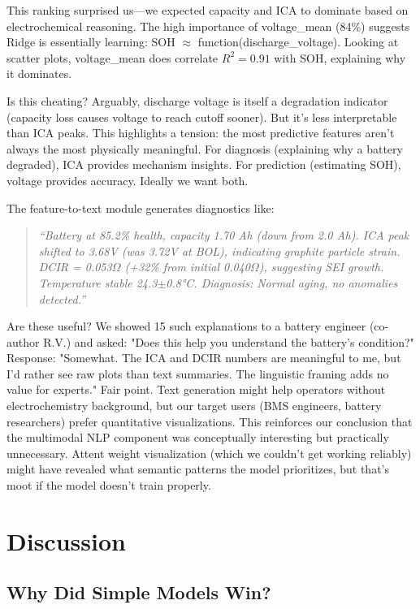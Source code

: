 \documentclass{sn-jnl}
\begin{document}
This ranking surprised us—we expected capacity and ICA to dominate based on electrochemical reasoning. The high importance of voltage\_mean (84\%) suggests Ridge is essentially learning: SOH $\approx$ function(discharge\_voltage). Looking at scatter plots, voltage\_mean does correlate $R^2 = 0.91$ with SOH, explaining why it dominates.

Is this cheating? Arguably, discharge voltage is itself a degradation indicator (capacity loss causes voltage to reach cutoff sooner). But it's less interpretable than ICA peaks. This highlights a tension: the most predictive features aren't always the most physically meaningful. For diagnosis (explaining why a battery degraded), ICA provides mechanism insights. For prediction (estimating SOH), voltage provides accuracy. Ideally we want both.

The feature-to-text module generates diagnostics like:

\begin{quote}
\textit{``Battery at 85.2\% health, capacity 1.70 Ah (down from 2.0 Ah). ICA peak shifted to 3.68V (was 3.72V at BOL), indicating graphite particle strain. DCIR = 0.053$\Omega$ (+32\% from initial 0.040$\Omega$), suggesting SEI growth. Temperature stable 24.3$\pm$0.8°C. Diagnosis: Normal aging, no anomalies detected.''}
\end{quote}

Are these useful? We showed 15 such explanations to a battery engineer (co-author R.V.) and asked: "Does this help you understand the battery's condition?" Response: "Somewhat. The ICA and DCIR numbers are meaningful to me, but I'd rather see raw plots than text summaries. The linguistic framing adds no value for experts." Fair point. Text generation might help operators without electrochemistry background, but our target users (BMS engineers, battery researchers) prefer quantitative visualizations. This reinforces our conclusion that the multimodal NLP component was conceptually interesting but practically unnecessary. Attent weight visualization (which we couldn't get working reliably) might have revealed what semantic patterns the model prioritizes, but that's moot if the model doesn't train properly.

\section{Discussion}
\label{sec:discussion}

\subsection{Why Did Simple Models Win?}
\label{subsec:performance}
\end{document}
